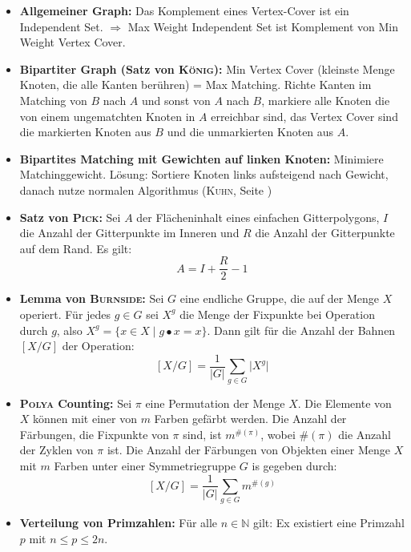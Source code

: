 \begin{itemize}
	\item \textbf{Allgemeiner Graph:}
	Das Komplement eines Vertex-Cover ist ein Independent Set.
	$\Rightarrow$ Max Weight Independent Set ist Komplement von Min Weight Vertex Cover.

	\item \textbf{Bipartiter Graph (Satz von \textsc{König}):}
	Min Vertex Cover (kleinste Menge Knoten, die alle Kanten berühren) = Max Matching.
	Richte Kanten im Matching von $B$ nach $A$ und sonst von $A$ nach $B$, markiere alle Knoten die von einem ungematchten Knoten in $A$ erreichbar sind, das Vertex Cover sind die markierten Knoten aus $B$ und die unmarkierten Knoten aus $A$.

	\item \textbf{Bipartites Matching mit Gewichten auf linken Knoten:}
	Minimiere Matchinggewicht.
	Lösung: Sortiere Knoten links aufsteigend nach Gewicht, danach nutze normalen Algorithmus (\textsc{Kuhn}, Seite \pageref{kuhn})

	\item \textbf{Satz von \textsc{Pick}:}
	Sei $A$ der Flächeninhalt eines einfachen Gitterpolygons, $I$ die Anzahl der Gitterpunkte im Inneren und $R$ die Anzahl der Gitterpunkte auf dem Rand.
	Es gilt:\vspace*{-\baselineskip}
	\[
		A = I + \frac{R}{2} - 1
	\]

	\item \textbf{Lemma von \textsc{Burnside}:}
	Sei $G$ eine endliche Gruppe, die auf der Menge $X$ operiert.
	Für jedes $g \in G$ sei $X^g$ die Menge der Fixpunkte bei Operation durch $g$, also $X^g = \{x \in X \mid g \bullet x = x\}$.
	Dann gilt für die Anzahl der Bahnen $[X/G]$ der Operation:
	\[
		[X/G] = \frac{1}{\vert G \vert} \sum_{g \in G} \vert X^g \vert
	\]

	\item \textbf{\textsc{Polya} Counting:}
	Sei $\pi$ eine Permutation der Menge $X$.
	Die Elemente von $X$ können mit einer von $m$ Farben gefärbt werden.
	Die Anzahl der Färbungen, die Fixpunkte von $\pi$ sind, ist $m^{\#(\pi)}$, wobei $\#(\pi)$ die Anzahl der Zyklen von $\pi$ ist.
	Die Anzahl der Färbungen von Objekten einer Menge $X$ mit $m$ Farben unter einer Symmetriegruppe $G$ is gegeben durch:
	\[
		[X/G] = \frac{1}{\vert G \vert} \sum_{g \in G} m^{\#(g)}
	\]

	\item \textbf{Verteilung von Primzahlen:}
	Für alle $n \in \mathbb{N}$ gilt: Ex existiert eine Primzahl $p$ mit $n \leq p \leq 2n$.


\end{itemize}
